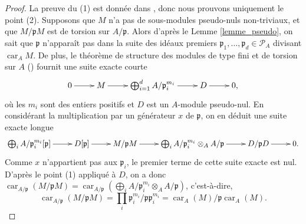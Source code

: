 \documentclass[12pt]{amsart}
\newcommand\cP{\mathcal{P}}
\newcommand\gp{\mathfrak{p}}
\newcommand\gq{\mathfrak{q}}
\newcommand\gQ{\mathfrak{Q}}
\newcommand{\ord}{\mathrm{ord}}
\DeclareMathOperator{\car}{car}
\theoremstyle{defstyle}
\theoremstyle{thmstyle}
\begin{document}
\begin{proof}
	
	La preuve du (1) est donnée dans \cite[Lemma 3.1]{ochiai2005euler}, donc nous prouvons uniquement le point (2). Supposons que $M$ n'a pas de sous-modules pseudo-nuls non-triviaux, et que $M /\gp M$ est de torsion sur $A/\gp$. Alors d'après le Lemme \ref{lemme_pseudo}, on sait que $\gp$ n'apparaît pas dans la suite des idéaux premiers $\gp_1, \ldots,\gp_d \in \cP_A$ divisant $\car_A M$. De plus, le théorème de structure des modules de type fini et de torsion sur $A$ (\cite[Chap. VII, §4.4, Théorème 5]{bourbaki2007algebre}) fournit une suite exacte courte 
	$$\xymatrix{
		0 \ar[r] & M  
		\ar[r]& \bigoplus_{i=1}^d A/\gp_i^{m_i} \ar[r] & D \ar[r]&0,
	}$$
	où les $m_i$ sont des entiers positifs et $D$ est un $A$-module pseudo-nul. En considérant la multiplication par un générateur $x$ de $\gp$, on en déduit une suite exacte longue
	$$\xymatrix{
		\bigoplus_i A/\gp_i^{m_i}[\gp] \ar[r] &  D[\gp]
		\ar[r]& M/\gp M \ar[r]& \bigoplus_i A/\gp_i^{m_i} \otimes_A A/\gp \ar[r] & D/\gp D \ar[r]&0.
	}$$
	Comme $x$ n'appartient pas aux $\gp_i$, le premier terme de cette suite exacte est nul. D'après le point (1) appliqué à $D$, on a donc $\car_{A/\gp} (M/\gp M) = \car_{A/\gp} \left(\bigoplus_i A/\gp_i^{m_i} \otimes_A A/\gp\right)$, c'est-à-dire, 
	\[\car_{A/\gp} (M/\gp M) = \prod_i \gp_i^{m_i}/\gp \gp_i^{m_i} = \car_A (M) /\gp \car_A (M).\]
\end{proof}
\end{document}

